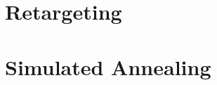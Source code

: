 \section{Retargeting}
\label{ch:Content2:sec:Retargeting}



\section{Simulated Annealing}
\label{ch:Content2:sec:SimulatedAnnealing}


